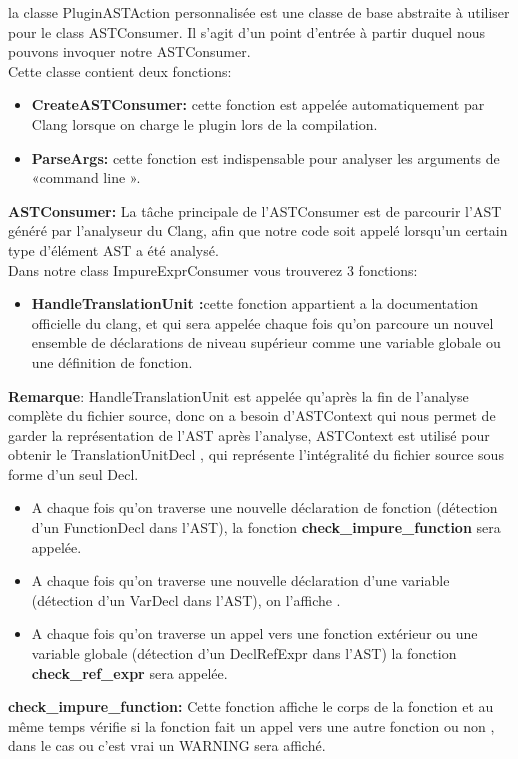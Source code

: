 \documentclass[12pt,titlepage]{article}
\begin{document}
la classe PluginASTAction personnalisée est une classe de base abstraite à utiliser pour  le class ASTConsumer. Il s’agit d’un point d'entrée à partir duquel nous pouvons invoquer notre ASTConsumer.\\
Cette classe contient deux fonctions:
\begin{itemize}
    \item \textbf{CreateASTConsumer:} cette fonction est appelée automatiquement par Clang  lorsque  on charge le plugin lors de la compilation.
	\item \textbf{ ParseArgs:} cette fonction est indispensable pour analyser les arguments de «command line ».
\end{itemize}
\textbf{ASTConsumer:} 
La tâche principale de l’ASTConsumer est de parcourir  l'AST généré par l'analyseur du Clang, afin que notre code soit appelé lorsqu'un certain type d'élément AST a été analysé.\\
Dans notre class ImpureExprConsumer vous trouverez 3 fonctions:
\begin{itemize}
    \item \textbf{HandleTranslationUnit :}cette fonction appartient a la documentation officielle du clang, et qui sera appelée chaque fois qu’on parcoure un nouvel ensemble de déclarations de niveau supérieur comme une variable globale ou une  définition de fonction.
\end{itemize}

\textbf{Remarque}: HandleTranslationUnit est appelée qu'après la fin de l’analyse complète du fichier source, donc on a besoin d’ASTContext qui nous permet de garder la représentation de l’AST après l’analyse, ASTContext  est utilisé pour obtenir le TranslationUnitDecl , qui représente l'intégralité du fichier source sous forme d’un seul Decl. \\
\begin{itemize}

\item A chaque fois qu’on traverse une nouvelle déclaration de fonction (détection d’un FunctionDecl dans l’AST), la fonction \textbf{check\_impure\_function}  sera appelée.
\item A chaque fois qu’on traverse une nouvelle déclaration d’une variable (détection d’un VarDecl dans l’AST), on l’affiche .
 \item A chaque fois qu’on traverse un appel vers une fonction extérieur ou une variable globale (détection d’un DeclRefExpr dans l’AST) la fonction \textbf{ check\_ref\_expr} sera appelée.
 \end{itemize}
\textbf{check\_impure\_function:}
 Cette fonction affiche le corps de la fonction  et au même temps vérifie si la fonction fait un appel vers une autre fonction ou non , dans le cas ou c’est vrai un WARNING sera affiché. 
\end{document}
